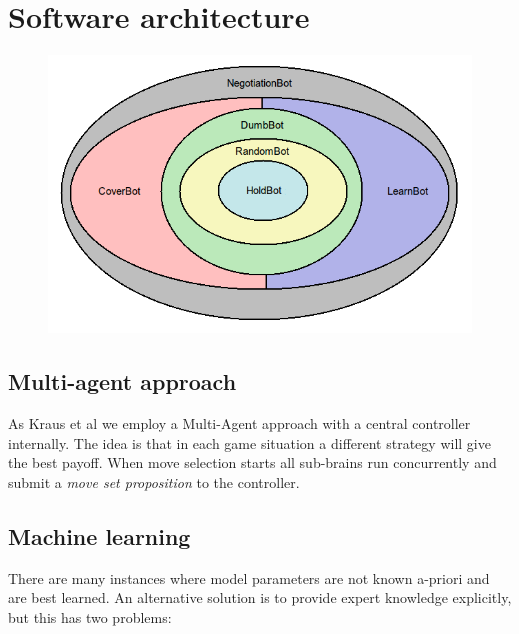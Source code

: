 \documentclass[pdftex,11pt,a4paper]{report}
\begin{document}

\pagebreak

\chapter{Software architecture}

\begin{figure}

\includegraphics[scale=0.75]{./report4_onion.png} \\[1cm]

\end{figure}

\section{Multi-agent approach}

As Kraus et al \cite{Kraus95} we employ a Multi-Agent approach with a 
central controller internally. The idea is that in each game situation
a different strategy will give the best payoff. When move selection starts
all sub-brains run concurrently and submit a \textit{move set proposition} to
the controller. 

\section{Machine learning}

There are many instances where model parameters are not known a-priori and
are best learned. An alternative solution is to provide expert knowledge 
explicitly, but this has two problems:
\end{document}
